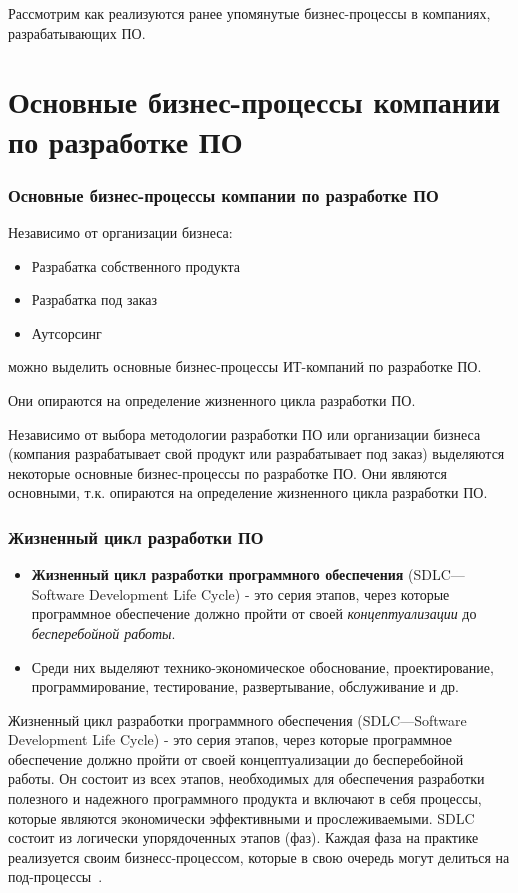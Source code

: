 \documentclass{../industrial-development}
\begin{document}
\begin{frame} 
\begin{block}{}
Рассмотрим как реализуются ранее упомянутые бизнес-процессы в компаниях, разрабатывающих ПО.
\end{block}
\end{frame}

\lecturenotes

\section{Основные бизнес-процессы компании по разработке ПО}

\begin{frame} \frametitle{Основные бизнес-процессы компании по разработке ПО}
Независимо от организации бизнеса:
\begin{itemize}
	\item Разрабатка собственного продукта
	\item Разрабатка под заказ
	\item Аутсорсинг
\end{itemize}
можно выделить \alert{основные} бизнес-процессы ИТ-компаний по разработке ПО. 
\begin {block}{}
Они опираются на определение \alert{жизненного цикла разработки ПО}.
\end {block}
\end{frame}
\lecturenotes
Независимо от выбора методологии разработки ПО или организации бизнеса (компания разрабатывает свой продукт или разрабатывает под заказ) выделяются некоторые основные бизнес-процессы по разработке ПО. Они являются основными, т.к. опираются на определение жизненного цикла разработки ПО.

\begin{frame} \frametitle{Жизненный цикл разработки ПО}
\begin{itemize}

	\item \textbf{Жизненный цикл разработки программного обеспечения} (SDLC---Software Development Life Cycle) - это серия этапов, через которые программное обеспечение должно пройти от своей \textit{концептуализации} до \textit{бесперебойной работы}.

	\item Среди них выделяют технико-экономическое обоснование, проектирование, программирование, тестирование, развертывание, обслуживание и др.
	
\end{itemize}
\end{frame}
\lecturenotes
Жизненный цикл разработки программного обеспечения (SDLC---Software Development Life Cycle) - это серия этапов, через которые программное обеспечение должно пройти от своей концептуализации до бесперебойной работы. Он состоит из всех этапов, необходимых для обеспечения разработки полезного и надежного программного продукта и включают в себя процессы, которые являются экономически эффективными и прослеживаемыми.
SDLC состоит из логически упорядоченных этапов (фаз). Каждая фаза на практике реализуется своим бизнесс-процессом, которые в свою очередь могут делиться на под-процессы~\cite{SDLC}.
\end{document}
